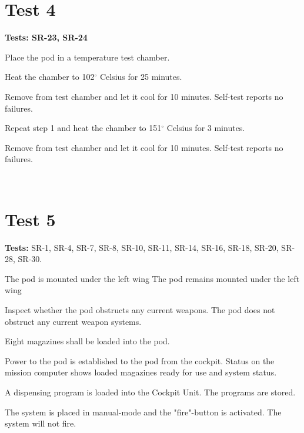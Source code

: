 \documentclass[Main]{subfiles}
\begin{document}
\newpage
\section{Test 4}

\textbf{Tests: SR-23, SR-24}


\begin{TestCaseIntro}
\end{TestCaseIntro}

\begin{TestCase}
\TC
{Place the pod in a temperature test chamber.}
{}


\TC
{Heat the chamber to 102$^\circ$ Celsius for 25 minutes.}
{}


\TC
{Remove from test chamber and let it cool for 10 minutes.}
{Self-test reports no failures.}

\TC
{Repeat step 1 and heat the chamber to 151$^\circ$ Celsius for 3 minutes.} 
{}

\TC
{Remove from test chamber and let it cool for 10 minutes.}
{Self-test reports no failures.}

\\
\end{TestCase}


\newpage
\section{Test 5}
\textbf{Tests: }
SR-1, SR-4, SR-7, SR-8, SR-10, SR-11, SR-14, SR-16, SR-18, SR-20, SR-28, SR-30.


\begin{TestCaseIntro}
\end{TestCaseIntro}

\begin{TestCase}
\TC
{The pod is mounted under the left wing}
{The pod remains mounted under the left wing}

\TC
{Inspect whether the pod obstructs any current weapons.}
{The pod does not obstruct any current weapon systems.}

\TC
{Eight magazines shall be loaded into the pod.}
{}

\TC
{Power to the pod is established to the pod from the cockpit.}
{Status on the mission computer shows loaded magazines ready for use and system status.}

\TC
{A dispensing program is loaded into the Cockpit Unit.}
{The programs are stored.}

\TC
{The system is placed in manual-mode and the "fire"-button is activated.}
{The system will not fire.}
\\

\end{TestCase}
\end{document}
